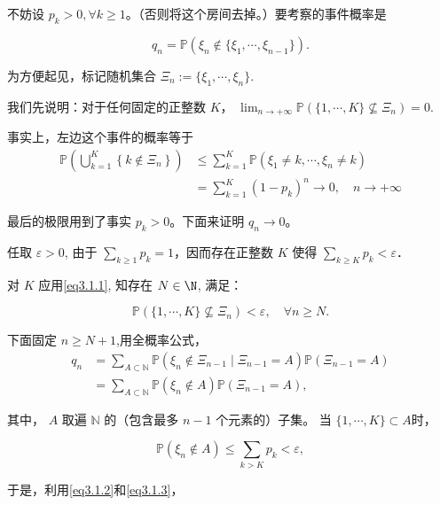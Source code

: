 不妨设 $ p_{k}>0, \forall k \geq 1 $。（否则将这个房间去掉。）要考察的事件概率是

$$q_{n}=\mathbb{P}(\xi_{n} \notin\{\xi_{1}, \cdots, \xi_{n-1}\}).$$

为方便起见，标记随机集合  $\Xi_{n}:=\{\xi_{1}, \cdots, \xi_{n}\}$.

我们先说明：对于任何固定的正整数 $ K $，
$\displaystyle \lim_{n \rightarrow+\infty} \mathbb{P}(\{1, \cdots, K\} \nsubseteq \Xi_{n})=0$.

事实上，左边这个事件的概率等于
\begin{equation}
\begin{aligned}
  \mathbb{P}\left(\bigcup_{k=1}^{K}\left\{k \notin \Xi_{n}\right\}\right)  &\leq \sum_{k=1}^{K} \mathbb{P}(\xi_{1} \neq k, \cdots, \xi_{n} \neq k) \\
 &=\sum_{k=1}^{K}\left(1-p_{k}\right)^{n} \rightarrow 0, \quad n \rightarrow+\infty
  
\end{aligned}
\label{eq3.1.1}
\end{equation}

最后的极限用到了事实  $p_{k}>0$。下面来证明  $q_{n} \rightarrow 0$。

任取  $\varepsilon>0$, 由于 $\sum_{k \geq 1} p_{k}=1$，因而存在正整数 $K$ 使得 $ \sum_{k \geq K} p_{k}<\varepsilon$．

对  $K$  应用\eqref{eq3.1.1}, 知存在 $N\in \N$, 满足：

\begin{equation}
  \mathbb{P}(\{1, \cdots, K\} \nsubseteq \Xi_{n})<\varepsilon, \quad \forall n \geq N.
  \label{eq3.1.2}
\end{equation}

下面固定 $ n \geq N+1 $,用全概率公式，
\begin{equation}
   \begin{aligned}
q_{n} & =\sum_{A \subset \mathbb{N}} \mathbb{P}(\xi_{n} \notin \Xi_{n-1} \mid \Xi_{n-1}=A) \mathbb{P}(\Xi_{n-1}=A) \\
& =\sum_{A \subset \mathbb{N}} \mathbb{P}(\xi_{n} \notin A) \mathbb{P}(\Xi_{n-1}=A),
 \end{aligned}
 \label{eq3.1.3}
\end{equation}

其中， $A$  取遍  $\mathbb{N} $ 的（包含最多  $n-1$  个元素的）子集。
当  $\{1, \cdots, K\} \subset A $时，

\[\mathbb{P}(\xi_{n} \notin A) \leq \sum_{k>K} p_{k}<\varepsilon,\]

于是，利用\eqref{eq3.1.2}和\eqref{eq3.1.3}，

